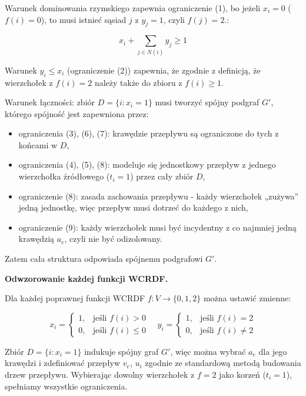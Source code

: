 Warunek dominowania rzymskiego zapewnia ograniczenie (1), bo jeżeli \( x_i = 0 \) (\( f(i) = 0 \)), to musi istnieć sąsiad \( j \) z \( y_j = 1 \), czyli \( f(j) = 2 \).:

\[
x_i + \sum_{j \in N(i)} y_j \geq 1
\]

Warunek \( y_i \leq x_i \) (ograniczenie (2)) zapewnia, że zgodnie z definicją, że wierzchołek z \( f(i) = 2 \) należy także do zbioru z \( f(i) \geq 1 \).

Warunek łączności: zbiór \( D = \{i : x_i = 1\} \) musi tworzyć spójny podgraf \( G' \), którego spójność jest zapewniona przez:

\begin{itemize}
    \item ograniczenia (3), (6), (7): krawędzie przepływu są ograniczone do tych z końcami w \( D \),
    \item ograniczenia (4), (5), (8): modeluje się jednostkowy przepływ z jednego wierzchołka źródłowego ($t_i = 1$) przez cały zbiór \( D \),
    \item ograniczenie (8): zasada zachowania przepływu - każdy wierzchołek „zużywa” jedną jednostkę, więc przepływ musi dotrzeć do każdego z nich,
    \item ograniczenie (9): każdy wierzchołek musi być incydentny z co najmniej jedną krawędzią $a_e$, czyli nie być odizolowany.
\end{itemize}

Zatem cała struktura odpowiada spójnemu podgrafowi \( G' \).

\textbf{Odwzorowanie każdej funkcji WCRDF.}

Dla każdej poprawnej funkcji WCRDF \( f : V \to \{0,1,2\} \) można ustawić zmienne:

\[
x_i =
\begin{cases}
1, & \text{jeśli } f(i) > 0 \\
0, & \text{jeśli } f(i) \leq 0
\end{cases}
\quad
y_i =
\begin{cases}
1, & \text{jeśli } f(i) = 2 \\
0, & \text{jeśli } f(i) \ne 2 
\end{cases}
\]

Zbiór \( D = \{i : x_i = 1\} \) indukuje spójny graf \( G' \), więc można wybrać \( a_e \) dla jego krawędzi i zdefiniować przepływ \( v_e \), \( u_i \) zgodnie ze standardową metodą budowania drzew przepływu. Wybierając dowolny wierzchołek z \( f = 2 \) jako korzeń ($t_i = 1$), spełniamy wszystkie ograniczenia.

